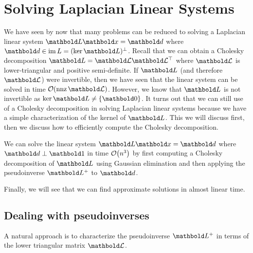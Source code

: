 
\chapter{Solving Laplacian Linear Systems}

We have seen by now that many problems can be reduced to solving a Laplacian linear system $\mL\vx = \vd$ where $\vd \in \im{L} = \compl{(\ker{\mL})}$. Recall that we can obtain a Cholesky decomposition $\mL = \mCalL\trans{\mCalL}$ where $\mCalL$ is lower-triangular and positive semi-definite. If $\mL$ (and therefore $\mCalL$) were invertible, then we have seen that the linear system can be solved in time $\LandauO{\nnz{\mCalL}}$. However, we know that $\mL$ is not invertible as $\ker{\mL} \neq \{\vZero\}$. It turns out that we can still use of a Cholesky decomposition in solving Laplacian linear systems because we have a simple characterization of the kernel of $\mL$. This we will discuss first, then we discuss how to efficiently compute the Cholesky decomposition.

\begin{thm}
We can solve the linear system $\mL\vx = \vd$ where $\vd \perp \vOne$ in time $\LandauO{n^3}$ by first computing a Cholesky decomposition of $\mL$ using Gaussian elimination and then applying the pseudoinverse $\pinv{\mL}$ to $\vd$.
\end{thm}

Finally, we will see that we can find approximate solutions in almost linear time.

\section{Dealing with pseudoinverses}

A natural approach is to characterize the pseudoinverse $\pinv{\mL}$ in terms of the lower triangular matrix $\mCalL$.

